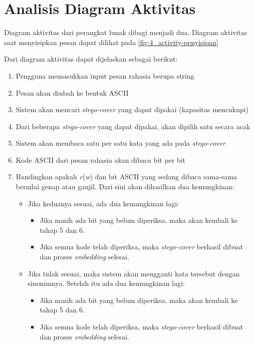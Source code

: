 \section{Analisis Diagram Aktivitas}

Diagram aktivitas dari perangkat lunak dibagi menjadi dua. Diagram aktivitas saat menyisipkan pesan dapat dilihat pada \ref{fig:4_activity-penyisipan}

Dari diagram aktivitas dapat dijelaskan sebagai berikut:

\begin{enumerate}
	\item Pengguna memasukkan input pesan rahasia berupa string
	\item Pesan akan diubah ke bentuk ASCII
	\item Sistem akan mencari \textit{stego-cover} yang dapat dipakai (kapasitas mencukupi)
	\item Dari beberapa \textit{stego-cover} yang dapat dipakai, akan dipilih satu secara acak
	\item Sistem akan membaca satu per satu kata yang ada pada \textit{stego-cover}
	\item Kode ASCII dari pesan rahasia akan dibaca bit per bit
	\item Bandingkan apakah \textit{c}(\textit{w}) dan bit ASCII yang sedang dibaca sama-sama bernilai genap atau ganjil. Dari sini akan dihasilkan dua kemungkinan:
	\begin{itemize}
		\item Jika keduanya sesuai, ada dua kemungkinan lagi:
		\begin{itemize}
			\item Jika masih ada bit yang belum diperiksa, maka akan kembali ke tahap 5 dan 6.
			\item Jika semua kode telah diperiksa, maka \textit{stego-cover} berhasil dibuat dan proses \textit{embedding} selesai.
		\end{itemize}
		\item Jika tidak sesuai, maka sistem akan mengganti kata tersebut dengan sinonimnya. Setelah itu ada dua kemungkinan lagi:
		\begin{itemize}
			\item Jika masih ada bit yang belum diperiksa, maka akan kembali ke tahap 5 dan 6.
			\item Jika semua kode telah diperiksa, maka \textit{stego-cover} berhasil dibuat dan proses \textit{embedding} selesai.
		\end{itemize}
	\end{itemize}
\end{enumerate}

